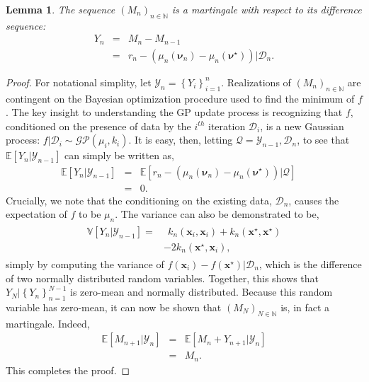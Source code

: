 \documentclass[]{article}
\newcommand{\paren}[1]{\left({#1}\right)}
\newcommand{\brac}[1]{\left[{#1}\right]}
\newcommand{\set}[1]{\left\{{#1}\right\}}
\newcommand{\E}[1]{\mathbb{E}\brac{{#1}}}
\newcommand{\V}[1]{\mathbb{V}\brac{{#1}}}
\newcommand{\1}{\mathbf{1}}
\newcommand{\0}{\mathbf{0}}
\newcommand{\x}{\mathbf{x}}
\newtheorem{lemma}[theorem]{Lemma}
\begin{document}
\begin{lemma}
	The sequence $(M_n)_{n \in \mathbb{N}}$ is a martingale with respect to its difference sequence:
  	\begin{eqnarray}
    	Y_n &=& M_n - M_{n-1} \\
        &=& r_n - (\mu_n\paren{\boldsymbol{\nu}_n} - \mu_n\paren{\boldsymbol{\nu}^\star}) | \mathcal{D}_n.
  	\end{eqnarray}
\end{lemma}
\begin{proof}
	For notational simplity, let $\mathcal{Y}_{n} = \set{Y_i}_{i=1}^{n}$. Realizations of $(M_n)_{n \in \mathbb{N}}$ are contingent on the Bayesian optimization procedure used to find the minimum of $f$. The key insight to understanding the GP update process is recognizing that $f$, conditioned on the presence of data by the $i^{th}$ iteration $\mathcal{D}_i$, is a new Gaussian process: $f|\mathcal{D}_{i} \sim \mathcal{GP}(\mu_i, k_i)$. It is easy, then, letting $\mathcal{Q} = \mathcal{Y}_{n-1}, \mathcal{D}_n$, to see that $\E{Y_n | \mathcal{Y}_{n-1}}$ can simply be written as,
  	\begin{eqnarray}
    	\E{Y_n | \mathcal{Y}_{n-1}} &=& \E{r_n - (\mu_n\paren{\boldsymbol{\nu}_n} - \mu_n\paren{\boldsymbol{\nu}^\star}) | \mathcal{Q}} ~~~~~\\
   		&=& 0.   
  	\end{eqnarray}
  	Crucially, we note that the conditioning on the existing data, $\mathcal{D}_n$, causes the expectation of $f$ to be $\mu_n$. The variance can also be demonstrated to be,
  	\begin{eqnarray}
    	\begin{aligned}
  	 	\V{Y_n | \mathcal{Y}_{n-1}} =& ~~k_n(\x_i, \x_i) + k_n(\x^\star, \x^\star) \\ &- 2k_n(\x^\star, \x_i),
        \end{aligned}
  	\end{eqnarray}
  	simply by computing the variance of $f(\x_i) - f(\x^\star) | \mathcal{D}_n$, which is the difference of two normally distributed random variables. Together, this shows that $Y_N | \set{Y_n}_{n=1}^{N-1}$ is zero-mean and normally distributed. Because this random variable has zero-mean, it can now be shown that $(M_N)_{N \in \mathbb{N}}$ is, in fact a martingale. Indeed, 
  	\begin{eqnarray}
    	\E{M_{n+1} | \mathcal{Y}_n} &=& \E{M_{n} + Y_{n+1} | \mathcal{Y}_n} \\
    	&=& M_n.
  	\end{eqnarray}
  	This completes the proof.
\end{proof}
\end{document}
